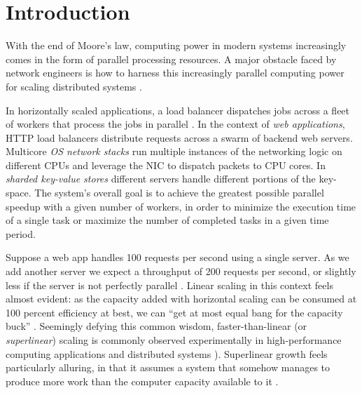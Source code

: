 \section{Introduction}\label{sec:introduction}

With the end of Moore's law, computing power in modern systems increasingly comes in the form of parallel processing resources.  A major obstacle faced by network engineers is how to harness this increasingly parallel computing power for scaling distributed systems \cite{265065, 10.5555/3307441.3307467, 10.1145/2815400.2815423, 10.1145/3098822.3098826, 10.5555/3154630.3154639}.

In horizontally scaled applications, a load balancer dispatches jobs across a fleet of workers that process the jobs in parallel \cite{10.5555/3235491}.  In the context of \emph{web applications}, HTTP load balancers \cite{194966, 211279, 9552525} distribute requests across a swarm of backend web servers.  %
Multicore \emph{OS network stacks} \cite{211263, 10.1145/3359989.3365412, 10.1145/3452296.3472914} run multiple instances of the networking logic on different CPUs and leverage the NIC to dispatch packets to CPU cores. %
In \emph{sharded key-value stores} \cite{ghigoff2021bmc} different servers handle different portions of the key-space.  The system's overall goal is to achieve the greatest possible parallel speedup with a given number of workers, in order to minimize the execution time of a single task or maximize the number of completed tasks in a given time period.

Suppose a web app handles 100 requests per second using a single server. As we add another server we expect a throughput of 200 requests per second, or slightly less if the server is not perfectly parallel \cite{10.1145/1465482.1465560}. Linear scaling in this context feels almost evident: as the capacity added with horizontal scaling can be consumed at 100 percent efficiency at best, we can ``get at most equal bang for the capacity buck'' \cite{10.1145/2773212.2789974}. Seemingly defying this common wisdom, faster-than-linear (or \emph{superlinear}) scaling is commonly observed experimentally in high-performance computing applications and distributed systems \cite{scalability-analyzed, 10.5555/1012889.1012894, 271208, icsoft20, sdn-analytitcs, 556383, 6483679, 10.1007/978-3-319-77610-1, dobb-1, dobb-2, 10.1145/3627703.3629574, 7733347, 80148}).  Superlinear growth feels particularly alluring, in that it assumes a system that somehow manages to produce more work than the computer capacity available to it \cite{10.1145/2773212.2789974}.

